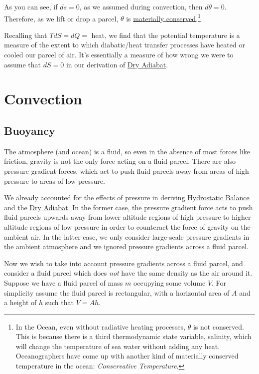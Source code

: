 As you can see, if $ds=0$, as we assumed during convection, then $d\theta=0$. Therefore, as we lift or drop a parcel, $\theta$ is \hyperref[Material Conservation]{materially conserved}.\footnote{In the Ocean, even without radiative heating processes, $\theta$ is not conserved. This is because there is a third thermodynamic state variable, salinity, which will change the temperature of sea water without adding any heat. Oceanographers have come up with another kind of materially conserved temperature in the ocean: \textit{Conservative Temperature}.}

Recalling that $TdS=dQ=$ heat, we find that the potential temperature is a measure of the extent to which diabatic/heat transfer processes have heated or cooled our parcel of air. It's essentially a measure of how wrong we were to assume that $dS=0$ in our derivation of \hyperref[Dry Adiabat]{Dry Adiabat}.

\section{Convection}\label{Convection}

\subsection{Buoyancy}

The atmosphere (and ocean) is a fluid, so even in the absence of most forces like friction, gravity is not the only force acting on a fluid parcel. There are also pressure gradient forces, which act to push fluid parcels away from areas of high pressure to areas of low pressure.

We already accounted for the effects of pressure in deriving \hyperref[Hydrostatic Balance]{Hydrostatic Balance} and the \hyperref[Dry Adiabat]{Dry Adiabat}. In the former case, the pressure gradient force acts to push fluid parcels upwards away from lower altitude regions of high pressure to higher altitude regions of low pressure in order to counteract the force of gravity on the ambient air. In the latter case, we only consider large-scale pressure gradients in the ambient atmosphere and we ignored pressure gradients across a fluid parcel.

Now we wish to take into account pressure gradients across a fluid parcel, and consider a fluid parcel which does \textit{not} have the same density as the air around it. Suppose we have a fluid parcel of mass $m$ occupying some volume $V$. For simplicity assume the fluid parcel is rectangular, with a horizontal area of $A$ and a height of $h$ such that $V=Ah$.

